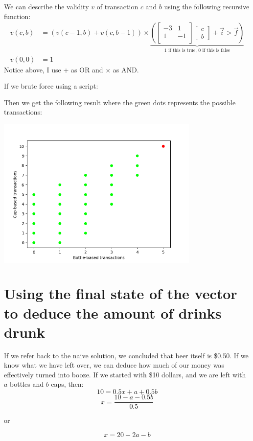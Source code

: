 \documentclass[letterpaper, 12pt]{article}
\begin{document}
We can describe the validity $v$ of transaction $c$ and $b$ using the following recursive function:
\begin{align*}
    v(c, b) &= (v(c - 1, b) + v(c, b - 1)) \times \underbrace{(
        \begin{bmatrix}
            -3 & 1\\
            1 & -1\\
        \end{bmatrix}
        \begin{bmatrix}
            c\\
            b
        \end{bmatrix}
        + \vec{i}
        >
        \vec{f}
    )}_\text{1 if this is true, 0 if this is false}\\
    v(0, 0) &= 1
\end{align*}
Notice above, I use + as OR and $\times$ as AND.

If we brute force using a script:



Then we get the following result where the green dots represents the possible transactions:
\begin{center}
    \includegraphics[width=0.75\textwidth]{python/debt.png}
\end{center}
\section{Using the final state of the vector to deduce the amount of drinks drunk}
\par If we refer back to the naive solution, we concluded that beer itself is \$0.50.
If we know what we have left over, we can deduce how much of our money was effectively turned into booze.
If we started with \$10 dollars, and we are left with $a$ bottles and $b$ caps, then:
$$10 = 0.5x + a + 0.5b$$
$$x = \frac{10 - a - 0.5b}{0.5}$$
\begin{center}
    or
\end{center}
\begin{equation}
    x = 20 - 2a - b
\end{equation}
\end{document}
